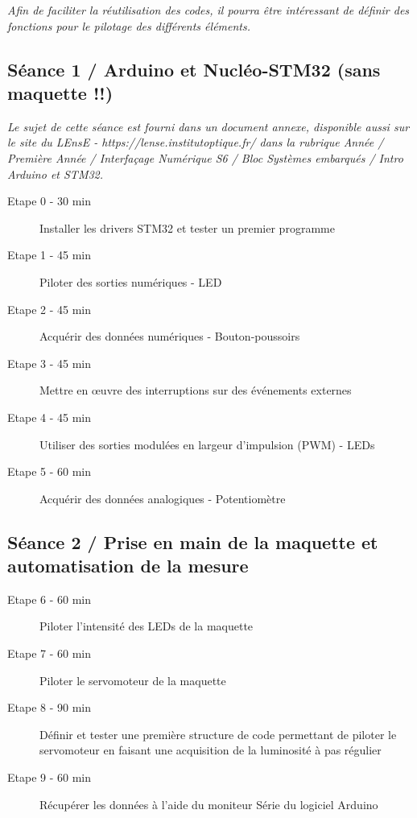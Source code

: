\documentclass[a4paper,11pt,titlepage]{article} %
\begin{document}
\textit{Afin de faciliter la réutilisation des codes, il pourra être intéressant de définir des fonctions pour le pilotage des différents éléments.}

\subsection{Séance 1 / Arduino et Nucléo-STM32 (sans maquette !!)}

\textit{Le sujet de cette séance est fourni dans un document annexe, disponible aussi sur le site du LEnsE - https://lense.institutoptique.fr/ dans la rubrique Année / Première Année / Interfaçage Numérique S6 / Bloc Systèmes embarqués / Intro Arduino et STM32.}

	\begin{description}
		\item[Etape 0 - 30 min] Installer les drivers STM32 et tester un premier programme
		\item[Etape 1 - 45 min] Piloter des sorties numériques - LED
		\item[Etape 2 - 45 min] Acquérir des données numériques - Bouton-poussoirs
		\item[Etape 3 - 45 min] Mettre en \oe{}uvre des interruptions sur des événements externes
		\item[Etape 4 - 45 min] Utiliser des sorties modulées en largeur d'impulsion (PWM) - LEDs
		\item[Etape 5 - 60 min] Acquérir des données analogiques - Potentiomètre
	\end{description}	

\subsection{Séance 2 / Prise en main de la maquette et automatisation de la mesure}

	\begin{description}
		\item[Etape 6 - 60 min] Piloter l'intensité des LEDs de la maquette
		\item[Etape 7 - 60 min] Piloter le servomoteur de la maquette
		\item[Etape 8 - 90 min] Définir et tester une première structure de code permettant de piloter le servomoteur en faisant une acquisition de la luminosité à pas régulier
		\item[Etape 9 - 60 min] Récupérer les données à l'aide du moniteur Série du logiciel Arduino
	\end{description}
	
\end{document}

